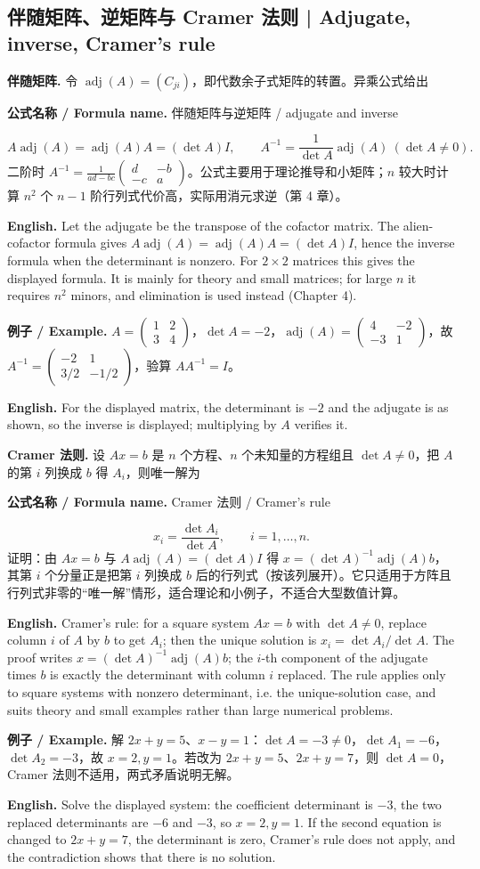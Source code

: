 \documentclass[UTF8,11pt,a4paper]{ctexart}
\newcommand{\EN}[1]{\par\noindent\textbf{English.} #1\par}
\newcommand{\FORMULA}[2]{\par\noindent\textbf{公式名称 / Formula name.} #1 / #2\par}
\newcommand{\EX}[2]{\par\noindent\textbf{例子 / Example.} #1\par\EN{#2}}
\begin{document}
\subsection{伴随矩阵、逆矩阵与 Cramer 法则 | Adjugate, inverse, Cramer's rule}
\noindent\textbf{伴随矩阵.} 令 $\operatorname{adj}(A)=(C_{ji})$，即代数余子式矩阵的转置。异乘公式给出
\FORMULA{伴随矩阵与逆矩阵}{adjugate and inverse}
\[
A\operatorname{adj}(A)=\operatorname{adj}(A)A=(\det A)I,\qquad
A^{-1}=\frac{1}{\det A}\operatorname{adj}(A)\ (\det A\ne0).
\]
二阶时 $A^{-1}=\frac{1}{ad-bc}\begin{pmatrix}d&-b\\-c&a\end{pmatrix}$。公式主要用于理论推导和小矩阵；$n$ 较大时计算 $n^2$ 个 $n-1$ 阶行列式代价高，实际用消元求逆（第 4 章）。
\EN{Let the adjugate be the transpose of the cofactor matrix. The alien-cofactor formula gives $A\operatorname{adj}(A)=\operatorname{adj}(A)A=(\det A)I$, hence the inverse formula when the determinant is nonzero. For $2\times2$ matrices this gives the displayed formula. It is mainly for theory and small matrices; for large $n$ it requires $n^2$ minors, and elimination is used instead (Chapter 4).}
\EX{$A=\begin{pmatrix}1&2\\3&4\end{pmatrix}$，$\det A=-2$，$\operatorname{adj}(A)=\begin{pmatrix}4&-2\\-3&1\end{pmatrix}$，故 $A^{-1}=\begin{pmatrix}-2&1\\3/2&-1/2\end{pmatrix}$，验算 $AA^{-1}=I$。}{For the displayed matrix, the determinant is $-2$ and the adjugate is as shown, so the inverse is displayed; multiplying by $A$ verifies it.}
\noindent\textbf{Cramer 法则.} 设 $Ax=b$ 是 $n$ 个方程、$n$ 个未知量的方程组且 $\det A\ne0$，把 $A$ 的第 $i$ 列换成 $b$ 得 $A_i$，则唯一解为
\FORMULA{Cramer 法则}{Cramer's rule}
\[
x_i=\frac{\det A_i}{\det A},\qquad i=1,\dots,n.
\]
证明：由 $Ax=b$ 与 $A\operatorname{adj}(A)=(\det A)I$ 得 $x=(\det A)^{-1}\operatorname{adj}(A)b$，其第 $i$ 个分量正是把第 $i$ 列换成 $b$ 后的行列式（按该列展开）。它只适用于方阵且行列式非零的“唯一解”情形，适合理论和小例子，不适合大型数值计算。
\EN{Cramer's rule: for a square system $Ax=b$ with $\det A\ne0$, replace column $i$ of $A$ by $b$ to get $A_i$; then the unique solution is $x_i=\det A_i/\det A$. The proof writes $x=(\det A)^{-1}\operatorname{adj}(A)b$; the $i$-th component of the adjugate times $b$ is exactly the determinant with column $i$ replaced. The rule applies only to square systems with nonzero determinant, i.e. the unique-solution case, and suits theory and small examples rather than large numerical problems.}
\EX{解 $2x+y=5$、$x-y=1$：$\det A=-3\ne0$，$\det A_1=-6$，$\det A_2=-3$，故 $x=2,y=1$。若改为 $2x+y=5$、$2x+y=7$，则 $\det A=0$，Cramer 法则不适用，两式矛盾说明无解。}{Solve the displayed system: the coefficient determinant is $-3$, the two replaced determinants are $-6$ and $-3$, so $x=2,y=1$. If the second equation is changed to $2x+y=7$, the determinant is zero, Cramer's rule does not apply, and the contradiction shows that there is no solution.}
\end{document}
